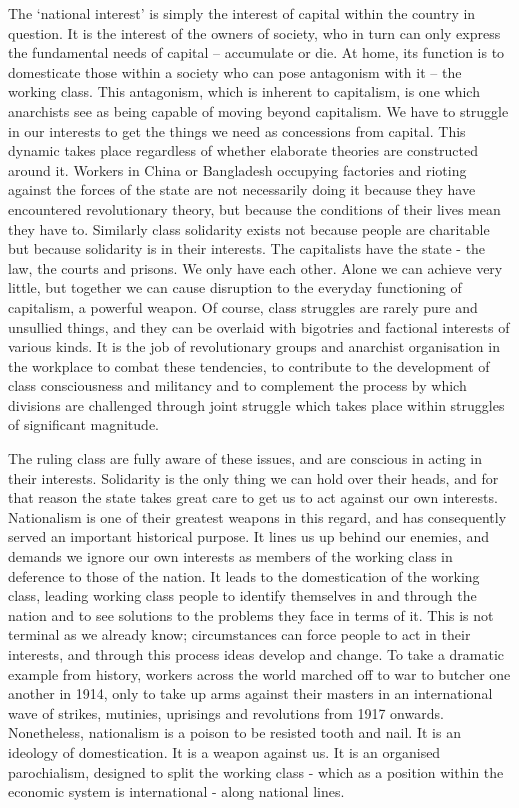 The ‘national interest’ is simply the interest of capital within the country in question. It is the interest of the owners of society, who in turn can only express the fundamental needs of capital – accumulate or die. At home, its function is to domesticate those within a society who can pose antagonism with it – the working class. This antagonism, which is inherent to capitalism, is one which anarchists see as being capable of moving beyond capitalism. We have to struggle in our interests to get the things we need as concessions from capital. This dynamic takes place regardless of whether elaborate theories are constructed around it. Workers in China or Bangladesh occupying factories and rioting against the forces of the state are not necessarily doing it because they have encountered revolutionary theory, but because the conditions of their lives mean they have to. Similarly class solidarity exists not because people are charitable but because solidarity is in their interests. The capitalists have the state - the law, the courts and prisons. We only have each other. Alone we can achieve very little, but together we can cause disruption to the everyday functioning of capitalism, a powerful weapon. Of course, class struggles are rarely pure and unsullied things, and they can be overlaid with bigotries and factional interests of various kinds. It is the job of revolutionary groups and anarchist organisation in the workplace to combat these tendencies, to contribute to the development of class consciousness and militancy and to complement the process by which divisions are challenged through joint struggle which takes place within struggles of significant magnitude.

The ruling class are fully aware of these issues, and are conscious in acting in their interests. Solidarity is the only thing we can hold over their heads, and for that reason the state takes great care to get us to act against our own interests. Nationalism is one of their greatest weapons in this regard, and has consequently served an important historical purpose. It lines us up behind our enemies, and demands we ignore our own interests as members of the working class in deference to those of the nation. It leads to the domestication of the working class, leading working class people to identify themselves in and through the nation and to see solutions to the problems they face in terms of it. This is not terminal as we already know; circumstances can force people to act in their interests, and through this process ideas develop and change. To take a dramatic example from history, workers across the world marched off to war to butcher one another in 1914, only to take up arms against their masters in an international wave of strikes, mutinies, uprisings and revolutions from 1917 onwards.
Nonetheless, nationalism is a poison to be resisted tooth and nail. It is an ideology of domestication.
It is a weapon against us. It is an organised parochialism, designed to split the working class - which as a position within the economic system is international - along national lines.

